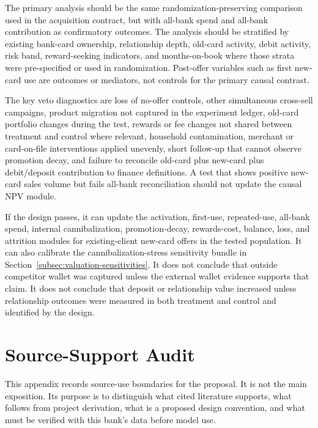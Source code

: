 \documentclass[11pt]{article}
\newcommand{\1}{\mathbf{1}}
\begin{document}
The primary analysis should be the same randomization-preserving comparison
used in the acquisition contract, but with all-bank spend and all-bank
contribution as confirmatory outcomes. The analysis should be stratified by
existing bank-card ownership, relationship depth, old-card activity, debit
activity, risk band, reward-seeking indicators, and months-on-book where those
strata were pre-specified or used in randomization. Post-offer variables such
as first new-card use are outcomes or mediators, not controls for the primary
causal contrast.

The key veto diagnostics are loss of no-offer controls, other simultaneous
cross-sell campaigns, product migration not captured in the experiment ledger,
old-card portfolio changes during the test, rewards or fee changes not shared
between treatment and control where relevant, household contamination,
merchant or card-on-file interventions applied unevenly, short follow-up that
cannot observe promotion decay, and failure to reconcile old-card plus
new-card plus debit/deposit contribution to finance definitions. A test that
shows positive new-card sales volume but fails all-bank reconciliation should
not update the causal NPV module.

If the design passes, it can update the activation, first-use, repeated-use,
all-bank spend, internal cannibalization, promotion-decay, rewards-cost,
balance, loss, and attrition modules for existing-client new-card offers in
the tested population. It can also calibrate the cannibalization-stress
sensitivity bundle in Section~\ref{subsec:valuation-sensitivities}. It does
not conclude that outside competitor wallet was captured unless the external
wallet evidence supports that claim. It does not conclude that deposit or
relationship value increased unless relationship outcomes were measured in
both treatment and control and identified by the design.

\section{Source-Support Audit}
\label{sec:audit}

This appendix records source-use boundaries for the proposal. It is not the
main exposition. Its purpose is to distinguish what cited literature supports,
what follows from project derivation, what is a proposed design convention, and
what must be verified with this bank's data before model use.
\end{document}

